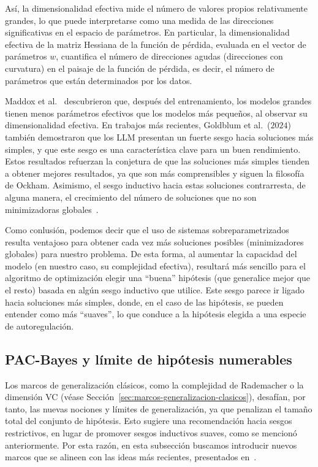 Así, la dimensionalidad efectiva mide el número de valores propios relativamente grandes, lo que puede interpretarse como una medida de las direcciones significativas en el espacio de parámetros. En particular, la dimensionalidad efectiva de la matriz Hessiana de la función de pérdida, evaluada en el vector de parámetros $w$, cuantifica el número de direcciones agudas (direcciones con curvatura) en el paisaje de la función de pérdida, es decir, el número de parámetros que están determinados por los datos.

Maddox et al.~\cite{Maddox2020} descubrieron que, después del entrenamiento, los modelos grandes tienen menos parámetros efectivos que los modelos más pequeños, al observar su dimensionalidad efectiva. En trabajos más recientes, Goldblum et al.~($2024$)~\cite{Goldblum2024} también demostraron que los LLM presentan un fuerte sesgo hacia soluciones más simples, y que este sesgo es una característica clave para un buen rendimiento. Estos resultados refuerzan la conjetura de que las soluciones más simples tienden a obtener mejores resultados, ya que son más comprensibles y siguen la filosofía de Ockham. Asimismo, el sesgo inductivo hacia estas soluciones contrarresta, de alguna manera, el crecimiento del número de soluciones que no son minimizadoras globales~\cite{Mingard2023}.

Como conlusión, podemos decir que el uso de sistemas sobreparametrizados resulta ventajoso para obtener cada vez más soluciones posibles (minimizadores globales) para nuestro problema. De esta forma, al aumentar la capacidad del modelo (en nuestro caso, su complejidad efectiva), resultará más sencillo para el algoritmo de optimización elegir una ``buena'' hipótesis (que generalice mejor que el resto) basada en algún sesgo inductivo que utilice. Este sesgo parece ir ligado hacia soluciones más simples, donde, en el caso de las hipótesis, se pueden entender como más ``suaves'', lo que conduce a la hipótesis elegida a una especie de autoregulación.

\subsection{PAC-Bayes y límite de hipótesis numerables}\label{subsec:pac-bayes}

Los marcos de generalización clásicos, como la complejidad de Rademacher o la dimensión VC (véase Sección~\ref{sec:marcos-generalizacion-clasicos}), desafían, por tanto, las nuevas nociones y límites de generalización, ya que penalizan el tamaño total del conjunto de hipótesis. Esto sugiere una recomendación hacia sesgos restrictivos, en lugar de promover sesgos inductivos suaves, como se mencionó anteriormente. Por esta razón, en esta subsección buscamos introducir nuevos marcos que se alineen con las ideas más recientes, presentados en~\cite{Wilson2025}.


